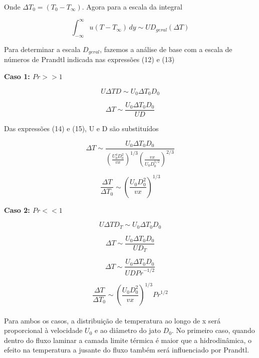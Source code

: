 \documentclass[12pt]{article}
\begin{document}
Onde $\Delta T_{0} = (T_{0} - T_\infty) $. Agora para a escala da integral

\begin{equation}
	\int_{-\infty}^{\infty} u (T - T_\infty) \, dy  \sim  U D_{geral} (\Delta T)
\end{equation}

Para determinar a escala $D_{geral}$, fazemos a análise de base com a escala de números de Prandtl indicada nas expressões (12) e (13)

\textbf{Caso 1: $Pr >> 1$}

\begin{equation}
	U \Delta T D \sim U_0 \Delta T_0 D_0
\end{equation}

\begin{equation}
	\Delta T \sim \frac{U_0 \Delta T_0 D_0}{U D}
\end{equation}

Das expressões (14) e (15), U e D são substituídos

\begin{equation}
	\Delta T \sim \frac{U_0 \Delta T_0 D_0}{\left( \frac{U_0^4 D_0^2}{v x} \right)^{1/3} \left( \frac{v x}{U_0 D_0^{1/2}} \right)^{2/3}}
\end{equation}

\begin{equation}
	\frac{\Delta T}{\Delta T_0} \sim \left( \frac{U_0 D_0^2}{v x} \right)^{1/3} 
\end{equation}

\textbf{Caso 2: $Pr << 1$}

\begin{equation}
	U \Delta T D_T \sim U_0 \Delta T_0 D_0
\end{equation}

\begin{equation}
	\Delta T \sim \frac{U_0 \Delta T_0 D_0}{U D_T}
\end{equation}

\begin{equation}
	\Delta T \sim \frac{U_0 \Delta T_0 D_0}{U D {Pr}^{-1/2}}
\end{equation}

\begin{equation}
	\frac{\Delta T}{\Delta T_0} \sim \left( \frac{U_0 D_0^2}{v x} \right)^{1/3}  {Pr}^{1/2}
\end{equation}
\\

Para ambos os casos, a distribuição de temperatura ao longo de x será proporcional à velocidade $U_{0}$ e ao diâmetro do jato $D_{0}$. No primeiro caso, quando dentro do fluxo laminar a camada limite térmica é maior que a hidrodinâmica, o efeito na temperatura a jusante do fluxo também será influenciado por Prandtl.
\end{document}
